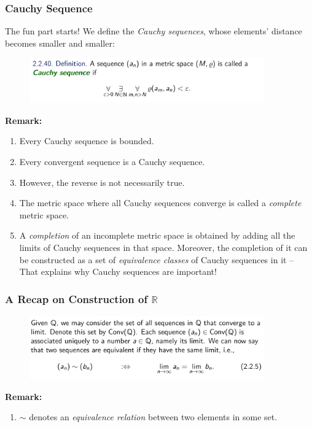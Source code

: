 \documentclass[10pt, t]{beamer}
\renewcommand{\emph}[1]{{\color{themecolor}\textsl{#1}}}
\newcommand{\R}{\mathbb{R}}
\begin{document}
\begin{frame}
    \frametitle{Cauchy Sequence}

    The fun part starts! We define the \emph{Cauchy sequences}, whose elements' distance becomes smaller and smaller:
    \begin{figure}[H]
        \centering
        \includegraphics[width=0.9\textwidth]{2020-10-13-19-57-33.png}
    \end{figure}

    \textbf{Remark:}
    \begin{enumerate}
        \item Every Cauchy sequence is bounded.
        \item Every convergent sequence is a Cauchy sequence.
        \item However, the reverse is not necessarily true.
        \item The metric space where all Cauchy sequences converge is called a \emph{complete} metric space.
        \item A \emph{completion} of an incomplete metric space is obtained by adding all the limits of Cauchy sequences in that space. Moreover, the completion of it can be constructed as a set of \emph{equivalence classes} of Cauchy sequences in it -- That explains why Cauchy sequences are important!
    \end{enumerate}
\end{frame}

\begin{frame}
    \frametitle{A Recap on Construction of $\R$}
    \begin{figure}[H]
        \centering
        \includegraphics[width=0.9\textwidth]{2020-10-13-20-08-40.png}
    \end{figure}
    \textbf{Remark:} 
    \begin{enumerate}[<+->]
        \item $\sim $ denotes an \emph{equivalence relation} between two elements in some set.
    \end{enumerate}
\end{frame}
\end{document}
